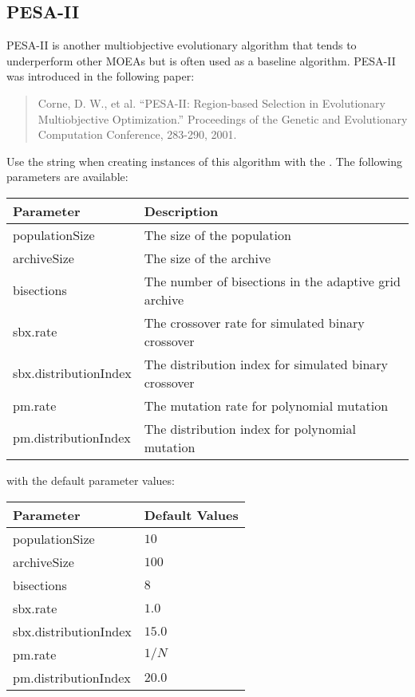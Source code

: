 \subsection{PESA-II}
PESA-II is another multiobjective evolutionary algorithm that tends to underperform other MOEAs but is often used as a baseline algorithm.  PESA-II was introduced in the following paper:
\begin{quote}
Corne, D. W., et al.  ``PESA-II: Region-based Selection in Evolutionary Multiobjective Optimization.''  Proceedings of the Genetic and Evolutionary Computation Conference, 283-290, 2001.
\end{quote}
Use the string  when creating instances of this algorithm with the .  The following parameters are available:
\newline
\newline
\begin{tabularx}{\linewidth}{lX}
  \hline
  Parameter & Description \\
  \hline
  populationSize & The size of the population \\
  archiveSize & The size of the archive \\
  bisections & The number of bisections in the adaptive grid archive \\
  sbx.rate & The crossover rate for simulated binary crossover \\
  sbx.distributionIndex & The distribution index for simulated binary crossover \\
  pm.rate & The mutation rate for polynomial mutation \\
  pm.distributionIndex & The distribution index for polynomial mutation \\
  \hline
\end{tabularx}
\newline
\newline
with the default parameter values:
\newline
\newline
\begin{tabularx}{\linewidth}{lX}
  \hline
  Parameter & Default Values \\
  \hline
  populationSize & $10$ \\
  archiveSize & $100$ \\
  bisections & $8$ \\
  sbx.rate & $1.0$ \\
  sbx.distributionIndex & $15.0$ \\
  pm.rate & $1/N$ \\
  pm.distributionIndex & $20.0$ \\
  \hline
\end{tabularx}

